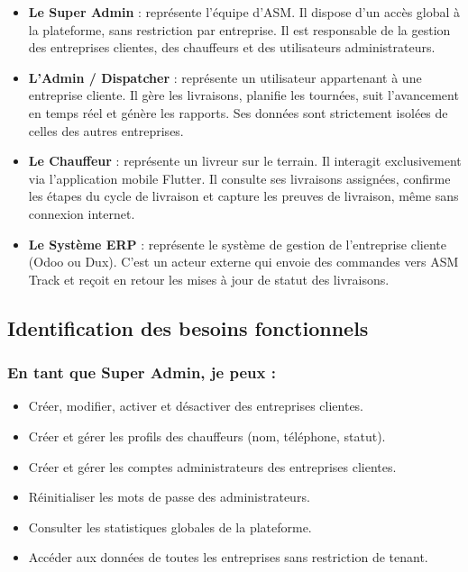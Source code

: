 \begin{itemize}
  \item \textbf{Le Super Admin} : représente l'équipe d'ASM. Il dispose d'un accès
        global à la plateforme, sans restriction par entreprise. Il est responsable
        de la gestion des entreprises clientes, des chauffeurs et des utilisateurs
        administrateurs.

  \item \textbf{L'Admin / Dispatcher} : représente un utilisateur appartenant à une
        entreprise cliente. Il gère les livraisons, planifie les tournées, suit
        l'avancement en temps réel et génère les rapports. Ses données sont
        strictement isolées de celles des autres entreprises.

  \item \textbf{Le Chauffeur} : représente un livreur sur le terrain. Il interagit
        exclusivement via l'application mobile Flutter. Il consulte ses livraisons
        assignées, confirme les étapes du cycle de livraison et capture les preuves
        de livraison, même sans connexion internet.

  \item \textbf{Le Système ERP} : représente le système de gestion de l'entreprise
        cliente (Odoo ou Dux). C'est un acteur externe qui envoie des commandes
        vers ASM Track et reçoit en retour les mises à jour de statut des livraisons.
\end{itemize}

\subsection{Identification des besoins fonctionnels}

\subsubsection*{En tant que Super Admin, je peux :}

\begin{itemize}
  \item Créer, modifier, activer et désactiver des entreprises clientes.
  \item Créer et gérer les profils des chauffeurs (nom, téléphone, statut).
  \item Créer et gérer les comptes administrateurs des entreprises clientes.
  \item Réinitialiser les mots de passe des administrateurs.
  \item Consulter les statistiques globales de la plateforme.
  \item Accéder aux données de toutes les entreprises sans restriction de tenant.
\end{itemize}

